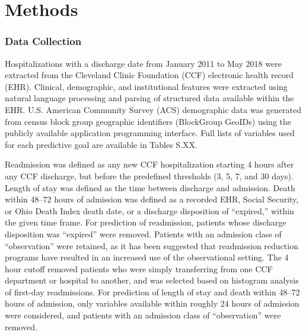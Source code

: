 \section{Methods}
\subsubsection{Data Collection}
Hospitalizations with a discharge date from January 2011 to May 2018 were extracted %
from the Cleveland Clinic Foundation (CCF) electronic health record (EHR).\@
Clinical, demographic, and institutional features were extracted using natural language processing %
and parsing of structured data available within the EHR.\@
U.S. American Community Survey (ACS) demographic data was generated %
from census block group geographic identifiers (BlockGroup GeoIDs) using the %
publicly available application programming interface.\supercite{acs}\@
Full lists of variables used for each predictive goal are available in Tables S.XX.\@ 

Readmission was defined as any new CCF hospitalization starting 4 hours after any CCF discharge, %
but before the predefined thresholds (3, 5, 7, and 30 days).\@
Length of stay was defined as the time between discharge and admission.\@
Death within 48--72 hours of admission was defined as a recorded EHR, Social Security, %
or Ohio Death Index death date, or a discharge disposition of ``expired,'' within the given time frame.\@
For prediction of readmission, patients whose discharge disposition was ``expired'' were removed.\@
Patients with an admission class of ``observation'' were retained, as it has been suggested that
readmission reduction programs have resulted in an increased use of the observational setting.\supercite{obs2016nejm, obsincreasing2019}
The 4 hour cutoff removed patients who were simply transferring from one CCF department or hospital %
to another, and was selected based on histogram analysis of first-day readmissions.\@ %
For prediction of length of stay and death within 48--72 hours of admission, %
only variables available within roughly 24 hours of admission were considered, %
and patients with an admission class of ``observation'' were removed.\@

\sloppy


